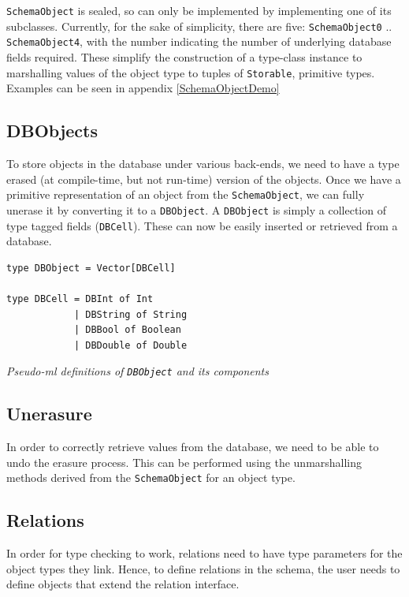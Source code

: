 \documentclass[12pt,a4paper,twoside,openright]{report}
\newcommand\codeName[1]{\texttt{#1}}
\newcommand\note[1]{\textit{#1}}
\renewcommand{\baselinestretch}{1.1}    %
\begin{document}
	\codeName{SchemaObject} is sealed, so can only be implemented by implementing one of its subclasses. Currently, for the sake of simplicity, there are five: \codeName{SchemaObject0} .. \codeName{SchemaObject4}, with the number indicating the number of underlying database fields required. These simplify the construction of a type-class instance to marshalling values of the object type to tuples of  \codeName{Storable}, primitive types. Examples can be seen in appendix \ref{SchemaObjectDemo}
	
	\subsection{DBObjects}
	
	To store objects in the database under various back-ends, we need to have a type erased (at compile-time, but not run-time) version of the objects. Once we have a primitive representation of an object from the \codeName{SchemaObject}, we can fully unerase it by converting it to a \codeName{DBObject}. A \codeName{DBObject} is simply a collection of type tagged fields (\codeName{DBCell}). These can now be easily inserted or retrieved from a database.
	
\renewcommand{\baselinestretch}{0.8}
\begin{framed}
	\begin{verbatim}
type DBObject = Vector[DBCell]

type DBCell = DBInt of Int 
			| DBString of String
			| DBBool of Boolean
			| DBDouble of Double
	\end{verbatim}
	
	\note{Pseudo-ml definitions of \codeName{DBObject} and its components}
\end{framed}
\renewcommand{\baselinestretch}{0.8}
	
	\subsection{Unerasure}
	In order to correctly retrieve values from the database, we need to be able to undo the erasure process. This can be performed using the unmarshalling methods derived from the \codeName{SchemaObject}  for an object type.
	\subsection{Relations}
	    In order for type checking to work, relations need to have type parameters for the object types they link. Hence, to define relations in the schema, the user needs to define objects that extend the relation interface.
	    
\end{document}
